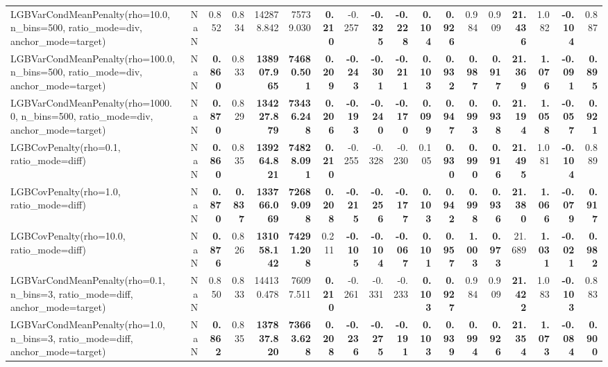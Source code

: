 \documentclass[11pt]{article}
\theoremstyle{plain}
\theoremstyle{definition}
\newcommand{\1}{\mathbf{1}}
\begin{document}
\begin{table}[htbp]
{\begin{tabular}{lrrrrrrrrrrrrrrrrr}
LGBVarCondMeanPenalty(rho=10.0, n\_bins=500, ratio\_mode=div, anchor\_mode=target) & NaN & 0.852 & 0.834 & 142878.842 & 75739.030 & \textbf{0.210} & -0.257 & \textbf{-0.325} & \textbf{-0.228} & \textbf{0.104} & \textbf{0.926} & 0.984 & 0.909 & \textbf{21.436} & 1.082 & \textbf{-0.104} & 0.887 \\
LGBVarCondMeanPenalty(rho=100.0, n\_bins=500, ratio\_mode=div, anchor\_mode=target) & NaN & \textbf{0.860} & 0.833 & \textbf{138907.965} & \textbf{74680.501} & \textbf{0.209} & \textbf{-0.243} & \textbf{-0.301} & \textbf{-0.211} & \textbf{0.103} & \textbf{0.932} & \textbf{0.987} & \textbf{0.917} & \textbf{21.369} & \textbf{1.076} & \textbf{-0.091} & \textbf{0.895} \\
LGBVarCondMeanPenalty(rho=1000.0, n\_bins=500, ratio\_mode=div, anchor\_mode=target) & NaN & \textbf{0.870} & 0.829 & \textbf{134227.879} & \textbf{73436.248} & \textbf{0.206} & \textbf{-0.193} & \textbf{-0.240} & \textbf{-0.170} & \textbf{0.099} & \textbf{0.947} & \textbf{0.993} & \textbf{0.938} & \textbf{21.194} & \textbf{1.058} & \textbf{-0.057} & \textbf{0.921} \\
\midrule
LGBCovPenalty(rho=0.1, ratio\_mode=diff) & NaN & \textbf{0.860} & 0.835 & \textbf{139264.821} & \textbf{74828.091} & \textbf{0.210} & -0.255 & -0.328 & -0.230 & 0.105 & \textbf{0.930} & \textbf{0.990} & \textbf{0.916} & \textbf{21.495} & 1.081 & \textbf{-0.104} & 0.889 \\
LGBCovPenalty(rho=1.0, ratio\_mode=diff) & NaN & \textbf{0.870} & \textbf{0.837} & \textbf{133766.069} & \textbf{72689.098} & \textbf{0.208} & \textbf{-0.215} & \textbf{-0.256} & \textbf{-0.177} & \textbf{0.103} & \textbf{0.942} & \textbf{0.998} & \textbf{0.936} & \textbf{21.380} & \textbf{1.066} & \textbf{-0.079} & \textbf{0.917} \\
LGBCovPenalty(rho=10.0, ratio\_mode=diff) & NaN & \textbf{0.876} & 0.826 & \textbf{131058.142} & \textbf{74291.208} & 0.211 & \textbf{-0.105} & \textbf{-0.104} & \textbf{-0.067} & \textbf{0.101} & \textbf{0.957} & \textbf{1.003} & \textbf{0.973} & 21.689 & \textbf{1.031} & \textbf{-0.021} & \textbf{0.982} \\
\midrule
LGBVarCondMeanPenalty(rho=0.1, n\_bins=3, ratio\_mode=diff, anchor\_mode=target) & NaN & 0.850 & 0.833 & 144130.478 & 76097.511 & \textbf{0.210} & -0.261 & -0.331 & -0.233 & \textbf{0.103} & \textbf{0.927} & 0.984 & 0.909 & \textbf{21.422} & 1.083 & \textbf{-0.103} & 0.883 \\
LGBVarCondMeanPenalty(rho=1.0, n\_bins=3, ratio\_mode=diff, anchor\_mode=target) & NaN & \textbf{0.862} & 0.835 & \textbf{137837.820} & \textbf{73663.628} & \textbf{0.208} & \textbf{-0.236} & \textbf{-0.275} & \textbf{-0.191} & \textbf{0.103} & \textbf{0.939} & \textbf{0.994} & \textbf{0.926} & \textbf{21.354} & \textbf{1.073} & \textbf{-0.084} & \textbf{0.900} \\

\end{tabular}}
\end{table}
\end{document}

